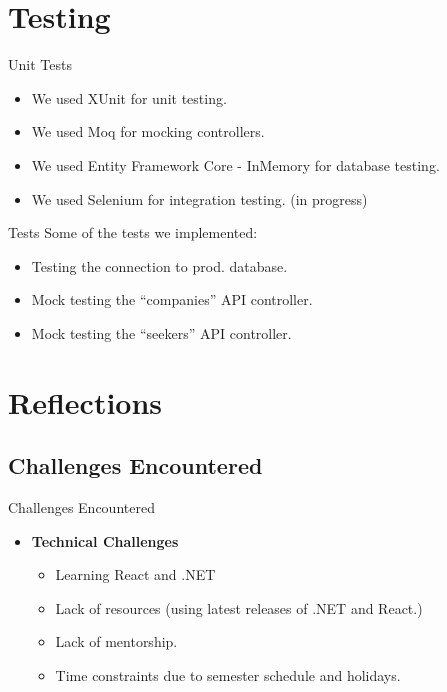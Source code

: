 \documentclass{beamer}
\begin{document}
\section{Testing}
\begin{frame}{Unit Tests}
    \begin{itemize}
        \item We used XUnit for unit testing.
        \item We used Moq for mocking controllers.
        \item We used Entity Framework Core - InMemory for database testing.
        \item We used Selenium for integration testing. (in progress)
\end{itemize}
\end{frame}
\begin{frame}{Tests}
    Some of the tests we implemented:
    \begin{itemize}
        \item Testing the connection to prod. database.
        \item Mock testing the ``companies'' API controller.
        \item Mock testing the ``seekers'' API controller.
\end{itemize}
\end{frame}

\section{Reflections}

\subsection{Challenges Encountered}
\begin{frame}{Challenges Encountered}
    \begin{itemize}
        \item \textbf{Technical Challenges}
        \begin{itemize}
            \item Learning React and .NET
            \item Lack of resources (using latest releases of .NET and React.)
            \item Lack of mentorship.
            \item Time constraints due to semester schedule and holidays.
        \end{itemize}
    \end{itemize}
\end{frame}
\end{document}
